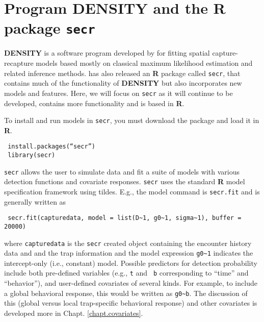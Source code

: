 \section{Program DENSITY and the R package \mbox{\tt secr} }
\label{mle.sec.secr}

{\bf DENSITY} is a software program developed by \citet{efford:2004}
for fitting spatial capture-recapture models based mostly on classical
maximum likelihood estimation and related inference methods.
\citet{efford:2011} has also released an {\bf R} package called
\mbox{\tt secr}, that contains much of the functionality of {\bf
  DENSITY} but also incorporates new models and features.  Here, we
will focus on \mbox{\tt secr} as it will continue to be developed,
contains more functionality and is based in {\bf R}.

To install
and run models in \mbox{\tt secr}, you must download the package and
load it in
{\bf R}.
\begin{verbatim}
 install.packages(“secr”)
 library(secr)
\end{verbatim}
\mbox{\tt secr} allows the user to simulate data and fit a suite of models with
various detection functions and covariate responses.  \mbox{\tt secr}
uses the
standard {\bf R} model specification framework using tildes. E.g., the model
command is \mbox{\tt secr.fit} and is generally written as
\begin{verbatim}
 secr.fit(capturedata, model = list(D~1, g0~1, sigma~1), buffer = 20000)
\end{verbatim}
where \mbox{\tt capturedata} is the \mbox{\tt secr} created object
containing the encounter history data and and the trap information and
the model expression \verb#g0~1# indicates the intercept-only (i.e.,
constant) model.  Possible predictors for detection probability
include both pre-defined variables (e.g., \mbox{\tt t} and \mbox{\tt
  b} corresponding to ``time'' and ``behavior''), and user-defined
covariates of several kinds.  For example, to include a global
behavioral response, this would be written as \verb#g0~b#.  The
discussion of this (global versus local trap-specific behavioral
response) and other covariates is developed more in
Chapt. \ref{chapt.covariates}.


